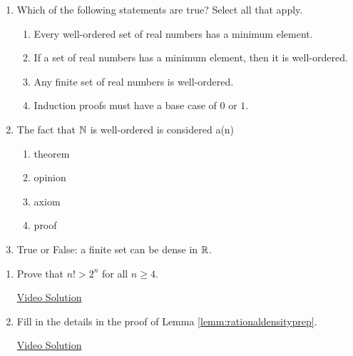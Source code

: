 \pagestyle{empty}


\begin{enumerate}
\item Which of the following statements are true? Select all that apply.
\begin{enumerate}
    \item Every well-ordered set of real numbers has a minimum element.
    \item If a set of real numbers has a minimum element, then it is well-ordered.
    \item Any finite set of real numbers is well-ordered.
    \item Induction proofs must have a base case of $0$ or $1$.
\end{enumerate}

\item The fact that $\mathbb{N}$ is well-ordered is considered a(n)
\begin{enumerate}
    \item theorem
    \item opinion
    \item axiom
    \item proof
\end{enumerate}

\item True or False: a finite set can be dense in $\mathbb{R}$.
\end{enumerate}



\begin{enumerate}
\item Prove that $n! > 2^n$ for all $n \geq 4$.

\href{https://youtu.be/xt3AgzI59LU}{Video Solution}

\item Fill in the details in the proof of Lemma \ref{lemm:rationaldensityprep}.

\href{https://youtu.be/n5v-6WAnj9M}{Video Solution}
\end{enumerate}

